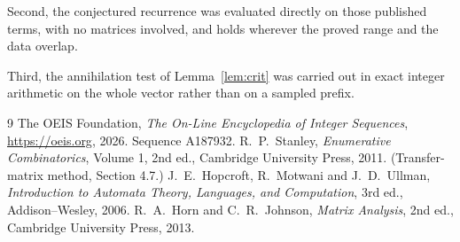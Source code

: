 \documentclass[11pt,a4paper]{article}
\theoremstyle{plain}
\theoremstyle{definition}
\begin{document}
Second, the conjectured recurrence was evaluated directly on those published terms, with no
matrices involved, and holds wherever the proved range and the data overlap.

Third, the annihilation test of Lemma~\ref{lem:crit} was carried out in exact integer
arithmetic on the whole vector rather than on a sampled prefix.

\begin{thebibliography}{9}
 The OEIS Foundation, \emph{The On-Line Encyclopedia of Integer
Sequences}, \url{https://oeis.org}, 2026. Sequence A187932.
 R.~P.~Stanley, \emph{Enumerative Combinatorics}, Volume 1, 2nd ed.,
Cambridge University Press, 2011. (Transfer-matrix method, Section 4.7.)
 J.~E.~Hopcroft, R.~Motwani and J.~D.~Ullman, \emph{Introduction to Automata
Theory, Languages, and Computation}, 3rd ed., Addison--Wesley, 2006.
 R.~A.~Horn and C.~R.~Johnson, \emph{Matrix Analysis}, 2nd ed., Cambridge
University Press, 2013.
\end{thebibliography}
\end{document}
